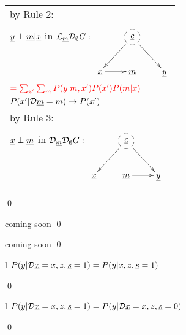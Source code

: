 \begin{longtable}{l}
\quad by Rule 2:
\begin{tabular}{l}
\\
\end{tabular}
\\
\quad
${\underline{y}}\perp{\underline{m}}|{\underline{x}}$ in
${\cal L}_{\underline{m}} {\cal D}_\emptyset G:$
$\xymatrix{
&*++[F-o]{\rvc}\ar[rd]\ar[ld]
\\
\rvx\ar[r]
&\rvm
&\rvy
}$
\\
$\color{red}=
\sum_{x'}
\sum_m
P(y|m, x')
P(x')
P(m|x)$
\\
\quad $P(x'|{\cal D}{\underline{m}}=m)
\rightarrow
P(x')$
\\
\quad by Rule 3:
\begin{tabular}{l}
\\
\end{tabular}
\\
\quad
${\underline{x}}\perp{\underline{m}}$ in
${\cal D}_{\underline{m}} {\cal D}_\emptyset G:$
$\xymatrix{
&*++[F-o]{\rvc}\ar[rd]\ar[ld]
\\
\rvx
&\rvm\ar[r]
&\rvy
}$
\end{longtable}
\qed



\begin{claim}
\label{cl-decNapkin}
\decNapkin
\end{claim}
\proof
coming soon
\qed


\begin{claim}
\label{cl-decWhy}
\decWhy
\end{claim}
\proof
coming soon
\qed

\begin{claim}
\label{cl-decTransportTrivial}
\decTransportTrivial
\end{claim}
\proof
\begin{longtable}{l}
\color{red}
$P(y|{\cal D}{\underline{x}}=x, z, {\underline{s}}=1)=
P(y|x, z, {\underline{s}}=1)$
\\
\xymatrix{
\\=
}
\end{longtable}
\qed

\begin{claim}
\label{cl-decTransportDirect}
\decTransportDirect
\end{claim}
\proof
\begin{longtable}{l}
\color{red}
$P(y|{\cal D}{\underline{x}}=x, z, {\underline{s}}=1)=
P(y|{\cal D}{\underline{x}}=x, z, {\underline{s}}=0)$
\\
\xymatrix{\\=}
\end{longtable}
\qed

